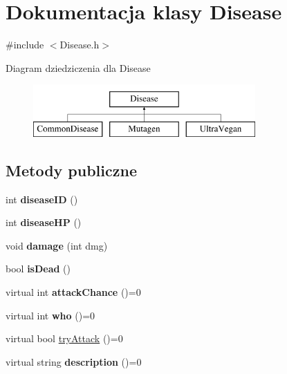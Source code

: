 \hypertarget{classDisease}{}\section{Dokumentacja klasy Disease}
\label{classDisease}


{\ttfamily \#include $<$Disease.\+h$>$}

Diagram dziedziczenia dla Disease\begin{figure}[H]
\begin{center}
\leavevmode
\includegraphics[height=2.000000cm]{classDisease}
\end{center}
\end{figure}
\subsection*{Metody publiczne}
\begin{DoxyCompactItemize}
\item 
int {\bfseries disease\+ID} ()\hypertarget{classDisease_aa767f0483110104290041bddc272fdbb}{}\label{classDisease_aa767f0483110104290041bddc272fdbb}

\item 
int {\bfseries disease\+HP} ()\hypertarget{classDisease_af9f0bf00f479ca6ecafcaa1d4664631a}{}\label{classDisease_af9f0bf00f479ca6ecafcaa1d4664631a}

\item 
void {\bfseries damage} (int dmg)\hypertarget{classDisease_a8e453ce6d51ac090aada3bf7993d04d9}{}\label{classDisease_a8e453ce6d51ac090aada3bf7993d04d9}

\item 
bool {\bfseries is\+Dead} ()\hypertarget{classDisease_aec6c5373af8923c7eeb23ab8601298cb}{}\label{classDisease_aec6c5373af8923c7eeb23ab8601298cb}

\item 
virtual int {\bfseries attack\+Chance} ()=0\hypertarget{classDisease_ae527ac8784e17279f5b796f83c0374d4}{}\label{classDisease_ae527ac8784e17279f5b796f83c0374d4}

\item 
virtual int {\bfseries who} ()=0\hypertarget{classDisease_a08e55daa6094568570d869ac86fa1f3b}{}\label{classDisease_a08e55daa6094568570d869ac86fa1f3b}

\item 
virtual bool \hyperlink{classDisease_a4186b72a74f3d2e654b38254ca0d32b7}{try\+Attack} ()=0
\item 
virtual string {\bfseries description} ()=0\hypertarget{classDisease_ab472fecd75428fa29567021314ff6bbe}{}\label{classDisease_ab472fecd75428fa29567021314ff6bbe}

\end{DoxyCompactItemize}


